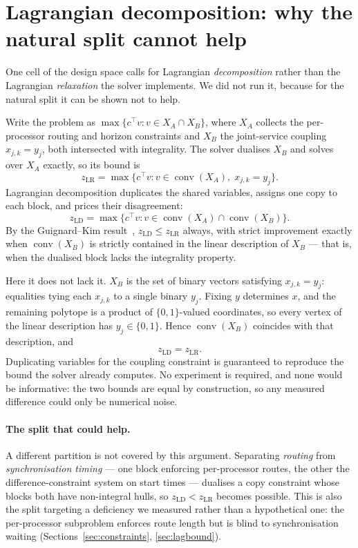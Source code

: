 \documentclass[11pt,a4paper]{article}
\begin{document}


\section{Lagrangian decomposition: why the natural split cannot help}\label{sec:ld}

One cell of the design space calls for Lagrangian \emph{decomposition} rather than
the Lagrangian \emph{relaxation} the solver implements. We did not run it, because
for the natural split it can be shown not to help.

Write the problem as $\max\{c^\top v : v \in X_A \cap X_B\}$, where $X_A$ collects
the per-processor routing and horizon constraints and $X_B$ the joint-service
coupling $x_{j,k}=y_j$, both intersected with integrality. The solver dualises
$X_B$ and solves over $X_A$ exactly, so its bound is
\[
z_{\mathrm{LR}}=\max\{c^\top v : v \in \operatorname{conv}(X_A),\; x_{j,k}=y_j\}.
\]
Lagrangian decomposition duplicates the shared variables, assigns one copy to each
block, and prices their disagreement:
\[
z_{\mathrm{LD}}=\max\{c^\top v : v \in \operatorname{conv}(X_A)\cap
\operatorname{conv}(X_B)\}.
\]
By the Guignard--Kim result~\cite{Guignard2003Lagrangean},
$z_{\mathrm{LD}}\le z_{\mathrm{LR}}$ always, with strict improvement exactly when
$\operatorname{conv}(X_B)$ is strictly contained in the linear description of
$X_B$ --- that is, when the dualised block lacks the integrality property.

Here it does not lack it. $X_B$ is the set of binary vectors satisfying
$x_{j,k}=y_j$: equalities tying each $x_{j,k}$ to a single binary $y_j$. Fixing
$y$ determines $x$, and the remaining polytope is a product of $\{0,1\}$-valued
coordinates, so every vertex of the linear description has $y_j\in\{0,1\}$. Hence
$\operatorname{conv}(X_B)$ coincides with that description, and
\[
z_{\mathrm{LD}}=z_{\mathrm{LR}} .
\]
Duplicating variables for the coupling constraint is guaranteed to reproduce the
bound the solver already computes. No experiment is required, and none would be
informative: the two bounds are equal by construction, so any measured difference
could only be numerical noise.

\paragraph{The split that could help.}
A different partition is not covered by this argument. Separating \emph{routing}
from \emph{synchronisation timing} --- one block enforcing per-processor routes, the
other the difference-constraint system on start times --- dualises a copy constraint
whose blocks both have non-integral hulls, so $z_{\mathrm{LD}}<z_{\mathrm{LR}}$
becomes possible. This is also the split targeting a deficiency we measured rather
than a hypothetical one: the per-processor subproblem enforces route length but is
blind to synchronisation waiting (Sections~\ref{sec:constraints},
\ref{sec:lagbound}).
\end{document}
